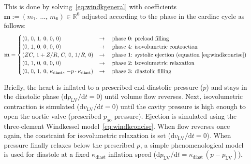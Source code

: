 \noindent
This is done by solving~\eqref{eq:windkgeneral} with coefficients  $\mathbf{m}:=(m_1,\,\dots,\,m_6)\in\mathbb{R}^6$ adjusted according to the phase in the cardiac cycle as follows:
%
\begin{equation}
    \mathbf{m} = \begin{cases}
    (0,\,0,\,1,\,0,\,0,\,0) & \rightarrow\quad\text{phase $0$: preload filling} \\
    (0,\,1,\,0,\,0,\,0,\,0) & \rightarrow\quad\text{phase $4$: isovolumetric contraction} \\
    (ZC,\,1+Z/R,\,C,\,0,\,1/R,\,0) & \rightarrow\quad\text{phase $1$: systolic ejection (equation~\eqref{eq:windkconcise})} \\
    (0,\,1,\,0,\,0,\,0,\,0) & \rightarrow\quad\text{phase $2$: isovolumetric relaxation} \\
    (0,\,0,\,1,\,0,\,\kappa_{\textrm{diast}},\,-p\cdot \kappa_{\textrm{diast}}) & \rightarrow\quad\text{phase $3$: diastolic filling}
    \end{cases}
\end{equation}

\noindent
Briefly, the heart is inflated to a prescribed end-diastolic pressure ($p$) and stays in the diastolic phase ($\textrm{d}p_{\textrm{LV}}/\textrm{d}t=0$) until volume flow reverses. Next, isovolumetric contraction is simulated ($\textrm{d}v_{\textrm{LV}}/\textrm{d}t=0$) until the cavity pressure is high enough to open the aortic valve (prescribed $p_{\textrm{ao}}$ pressure). Ejection is simulated using the three-element Windkessel model~\eqref{eq:windkconcise}. When flow reverses once again, the constraint for isovolumetric relaxation is set ($\textrm{d}v_{\textrm{LV}}/\textrm{d}t=0$). When pressure finally relaxes below the prescribed $p$, a simple phenomenological model is used for diastole at a fixed $\kappa_{\textrm{diast}}$ inflation speed ($\textrm{d}p_{\textrm{LV}}/\textrm{d}t=\kappa_{\textrm{diast}}\,(p - p_{\textrm{LV}})$).


%
%
%

